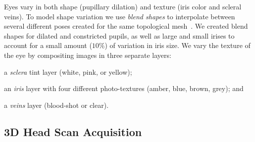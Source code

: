Eyes vary in both shape (pupillary dilation) and texture (iris color and scleral veins).
To model shape variation we use \emph{blend shapes}
to interpolate between several different poses created for the same topological mesh~\cite{orvalho2012facial}. 
We created blend shapes for dilated and constricted pupils, as well as large and small irises to account for a small amount ($10\%$) of variation in iris size.
We vary the texture of the eye by compositing images in three separate layers:
\begin{inparaenum}
\item a \emph{sclera} tint layer (white, pink, or yellow);
\item an \emph{iris} layer with four different photo-textures (amber, blue, brown, grey); and
\item a \emph{veins} layer (blood-shot or clear).
\end{inparaenum}

\subsection{3D Head Scan Acquisition}
\label{sec:eye_region_geom_prep}

